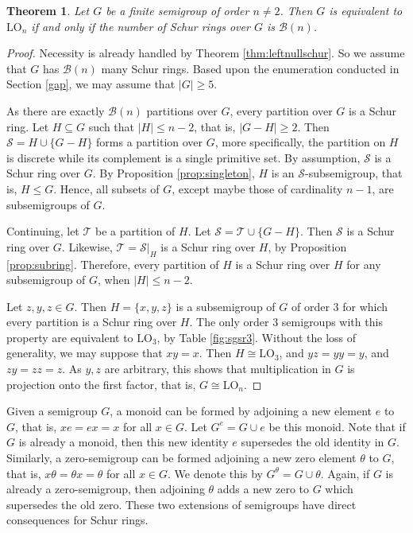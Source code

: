 \documentclass{article}
\theoremstyle{plain}
\newtheorem{Thm}{Theorem}[section]
\theoremstyle{definition}
\newcommand{\thmref}[1]{Theorem \ref{#1}}
\newcommand{\propref}[1]{Proposition \ref{#1}}
\renewcommand{\S}{\mathcal{S}}
\newcommand{\T}{\mathcal{T}}
\newcommand{\B}{\mathscr{B}}
\newcommand{\LO}{\mathrm{LO}}
\begin{document}
\begin{Thm}\label{leftnullconverse} Let $G$ be a finite semigroup of order $n\neq 2$. Then $G$ is equivalent to $\LO_n$ if and only if the number of Schur rings over $G$ is $\B(n)$.
\end{Thm}
\begin{proof}
   Necessity is already handled by \thmref{thm:leftnullschur}. So we assume that $G$ has $\B(n)$ many Schur rings. Based upon the enumeration conducted in Section \ref{gap}, we may assume that $|G|\ge 5$.
        
    As there are exactly $\B(n)$ partitions over $G$, every partition over $G$ is a Schur ring. Let $H\subseteq G$ such that $|H|\le n-2$, that is, $|G - H| \ge 2$. Then $\S = H\cup \{G - H\}$ forms a partition over $G$, more specifically, the partition on $H$ is discrete while its complement is a single primitive set. By assumption, $\S$ is a Schur ring over $G$. By \propref{prop:singleton}, $H$ is an $\S$-subsemigroup, that is, $H\le G$. Hence, all subsets of $G$, except maybe those of cardinality $n-1$, are subsemigroups of $G$.

    Continuing, let $\T$ be a partition of $H$. Let $\S = \T\cup \{G - H\}$. Then $\S$ is a Schur ring over $G$. Likewise, $\T=\S|_H$ is a Schur ring over $H$, by \propref{prop:subring}. Therefore, every partition of $H$ is a Schur ring over $H$ for any subsemigroup of $G$, when $|H|\le n-2$. 

    Let $z,y,z\in G$. Then $H=\{x,y,z\}$ is a subsemigroup of $G$ of order $3$ for which every partition is a Schur ring over $H$. The only order $3$ semigroups with this property are equivalent to $\LO_3$, by Table \ref{fig:sgsr3}. Without the loss of generality, we may suppose that $xy = x$. Then $H\cong \LO_3$, and $yz = yy = y$, and $zy = zz = z$. As $y,z$ are arbitrary, this shows that multiplication in $G$ is projection onto the first factor, that is, $G\cong \LO_n$.
\end{proof}

Given a semigroup $G$, a monoid can be formed by adjoining a new element $e$ to $G$, %
that is, $xe=ex=x$ for all $x\in G$. Let \label{monoid}$G^e=G\cup e$ be this monoid. Note that if $G$ is already a monoid, then this new identity $e$ supersedes the old identity in $G$. Similarly, a zero-semigroup can be formed adjoining a new zero element $\theta$ to $G$, that is, $x\theta  = \theta x = \theta$ for all $x\in G$. We denote this by \label{theta}$G^\theta = G\cup \theta$. Again, if $G$ is already a zero-semigroup, then adjoining $\theta$ adds a new zero to $G$ which supersedes the old zero. These two extensions of semigroups have direct consequences for Schur rings.
\end{document}
